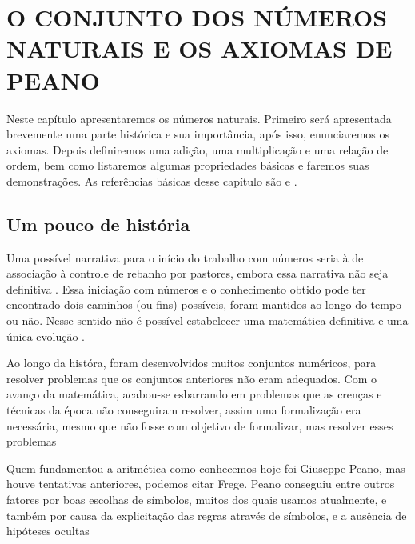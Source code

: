 \documentclass[../main.tex]{subfiles}
\begin{document}
\chapter{O CONJUNTO DOS NÚMEROS NATURAIS E OS AXIOMAS DE PEANO}
Neste capítulo apresentaremos os números naturais. Primeiro será apresentada brevemente uma parte histórica e sua importância, após isso, enunciaremos os axiomas. Depois definiremos uma adição, uma multiplicação e uma relação de ordem, bem como listaremos algumas propriedades básicas e faremos suas demonstrações. As referências básicas desse capítulo são \Parencite{domingues-2009} e \Parencite{ferreira}.

\section{Um pouco de história}

Uma possível narrativa para o início do trabalho com números seria à de associação à controle de rebanho por pastores, embora essa narrativa não seja definitiva \Parencite{roque}. Essa iniciação com números e o conhecimento obtido pode ter encontrado dois caminhos (ou fins) possíveis, foram mantidos ao longo do tempo ou não. Nesse sentido não é possível estabelecer uma matemática definitiva e uma única evolução \Parencite[p. 35]{roque}. 

Ao longo da históra, foram desenvolvidos muitos conjuntos numéricos, para resolver problemas que os conjuntos anteriores não eram adequados. 
Com o avanço da matemática, acabou-se esbarrando em problemas que as crenças e técnicas da época não conseguiram resolver, assim uma formalização era necessária, mesmo que não fosse com objetivo de formalizar, mas resolver esses problemas \Parencite[p. 407]{roque}

Quem fundamentou a aritmética como conhecemos hoje foi Giuseppe Peano, mas houve tentativas anteriores, podemos citar Frege. 
Peano conseguiu entre outros fatores por boas escolhas de símbolos, muitos dos quais usamos atualmente, e também por causa da explicitação das regras através de símbolos, e a ausência de hipóteses ocultas \Parencite[p. 415]{boyer}
\end{document}
